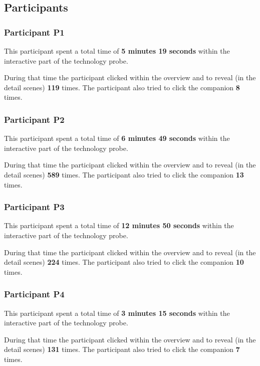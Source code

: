 \begin{appendices}
  \subsection*{Participants}

  \subsubsection*{Participant P1}

  This participant spent a total time of \textbf{5 minutes 19 seconds} within the interactive part of the technology probe.

  During that time the participant clicked within the overview and to reveal (in the detail scenes) \textbf{119} times. The participant also tried to click the companion \textbf{8} times.


  \subsubsection*{Participant P2}

  This participant spent a total time of \textbf{6 minutes 49 seconds} within the interactive part of the technology probe.

  During that time the participant clicked within the overview and to reveal (in the detail scenes) \textbf{589} times. The participant also tried to click the companion \textbf{13} times.


  \subsubsection*{Participant P3}

  This participant spent a total time of \textbf{12 minutes 50 seconds} within the interactive part of the technology probe.

  During that time the participant clicked within the overview and to reveal (in the detail scenes) \textbf{224} times. The participant also tried to click the companion \textbf{10} times.


  \subsubsection*{Participant P4}

  This participant spent a total time of \textbf{3 minutes 15 seconds} within the interactive part of the technology probe.

  During that time the participant clicked within the overview and to reveal (in the detail scenes) \textbf{131} times. The participant also tried to click the companion \textbf{7} times.



\end{appendices}
